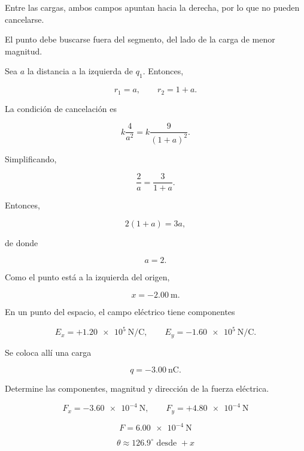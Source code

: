 \begin{explicacion}

Entre las cargas, ambos campos apuntan hacia la derecha, por lo que no pueden cancelarse.

El punto debe buscarse fuera del segmento, del lado de la carga de menor magnitud.

Sea \(a\) la distancia a la izquierda de \(q_1\). Entonces,

\[
r_1=a,\qquad r_2=1+a.
\]

La condición de cancelación es

\[
k\frac{4}{a^2}=k\frac{9}{(1+a)^2}.
\]

Simplificando,

\[
\frac{2}{a}=\frac{3}{1+a}.
\]

Entonces,

\[
2(1+a)=3a,
\]

de donde

\[
a=2.
\]

Como el punto está a la izquierda del origen,

\[
\boxed{x=-\SI{2.00}{\metre}}.
\]

\end{explicacion}


\begin{ejercicio}

En un punto del espacio, el campo eléctrico tiene componentes

\[
E_x=+\SI{1.20e5}{\newton\per\coulomb},
\qquad
E_y=-\SI{1.60e5}{\newton\per\coulomb}.
\]

Se coloca allí una carga

\[
q=-\SI{3.00}{\nano\coulomb}.
\]

Determine las componentes, magnitud y dirección de la fuerza eléctrica.

\end{ejercicio}

\begin{respuesta}

\[
\boxed{F_x=-\SI{3.60e-4}{\newton}},
\qquad
\boxed{F_y=+\SI{4.80e-4}{\newton}}
\]

\[
\boxed{F=\SI{6.00e-4}{\newton}}
\]

\[
\boxed{\theta\approx126.9^\circ\text{ desde }+x}
\]

\end{respuesta}

